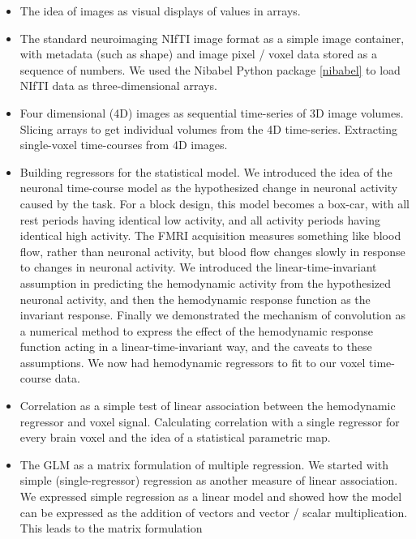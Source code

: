 \begin{itemize}

\item
    The idea of images as visual displays of values in arrays.
\item
    The standard neuroimaging NIfTI image format as a simple image container,
        with metadata (such as shape) and image pixel / voxel data stored as
        a sequence of numbers.  We used the Nibabel Python package
        \cref{nibabel} to load NIfTI data as three-dimensional arrays.
\item
    Four dimensional (4D) images as sequential time-series of 3D image
        volumes.  Slicing arrays to get individual volumes from the 4D
        time-series.  Extracting single-voxel time-courses from 4D images.
\item
    Building regressors for the statistical model.  We introduced the idea of
        the neuronal time-course model as the hypothesized change in neuronal
        activity caused by the task.  For a block design, this model becomes a
        box-car, with all rest periods having identical low activity, and all
        activity periods having identical high activity.  The FMRI acquisition
        measures something like blood flow, rather than neuronal activity, but
        blood flow changes slowly in response to changes in neuronal activity.
        We introduced the linear-time-invariant assumption in predicting the
        hemodynamic activity from the hypothesized neuronal activity, and then
        the hemodynamic response function as the invariant response.  Finally
        we demonstrated the mechanism of convolution as a numerical method to
        express the effect of the hemodynamic response function acting in a
        linear-time-invariant way, and the caveats to these assumptions.  We
        now had hemodynamic regressors to fit to our voxel time-course data.
\item
    Correlation as a simple test of linear association between the hemodynamic
        regressor and voxel signal.  Calculating correlation with a single
        regressor for every brain voxel and the idea of a statistical
        parametric map.
\item
    The GLM as a matrix formulation of multiple regression.  We started with
        simple (single-regressor) regression as another measure of linear
        association.  We expressed simple regression as a linear model and
        showed how the model can be expressed as the addition of vectors and
        vector / scalar multiplication.  This leads to the matrix formulation

\end{itemize}
